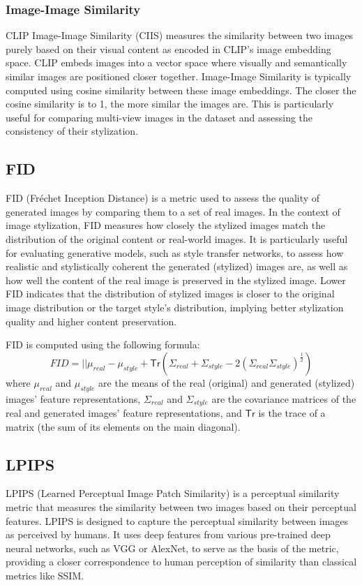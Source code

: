 \subsubsection{Image-Image Similarity}
CLIP Image-Image Similarity (CIIS) measures the similarity between two images purely based on their visual content as encoded in CLIP's image embedding space. CLIP embeds images into a vector space where visually and semantically similar images are positioned closer together. Image-Image Similarity is typically computed using cosine similarity between these image embeddings. The closer the cosine similarity is to 1, the more similar the images are. This is particularly useful for comparing multi-view images in the dataset and assessing the consistency of their stylization.

\subsection{FID}
FID (Fréchet Inception Distance) is a metric used to assess the quality of generated images by comparing them to a set of real images. In the context of image stylization, FID measures how closely the stylized images match the distribution of the original content or real-world images. It is particularly useful for evaluating generative models, such as style transfer networks, to assess how realistic and stylistically coherent the generated (stylized) images are, as well as how well the content of the real image is preserved in the stylized image. Lower FID indicates that the distribution of stylized images is closer to the original image distribution or the target style's distribution, implying better stylization quality and higher content preservation.

FID is computed using the following formula:
\begin{equation}
    FID = ||\mu_{real} - \mu _{style} + \mathsf{Tr} (\Sigma _{real} + \Sigma _{style} - 2(\Sigma_{real} \Sigma_{style} )^\frac{1}{2})
\end{equation}
where $\mu_{real}$ and $\mu_{style}$ are the means of the real (original) and generated (stylized) images' feature representations, $\Sigma_{real}$ and $\Sigma_{style}$ are the covariance matrices of the real and generated images' feature representations, and $\mathsf{Tr}$ is the trace of a matrix (the sum of its elements on the main diagonal).

\subsection{LPIPS}
LPIPS (Learned Perceptual Image Patch Similarity) \citep{Zhang.2018} is a perceptual similarity metric that measures the similarity between two images based on their perceptual features. LPIPS is designed to capture the perceptual similarity between images as perceived by humans. It uses deep features from various pre-trained deep neural networks, such as VGG or AlexNet, to serve as the basis of the metric, providing a closer correspondence to human perception of similarity than classical metrics like SSIM.


